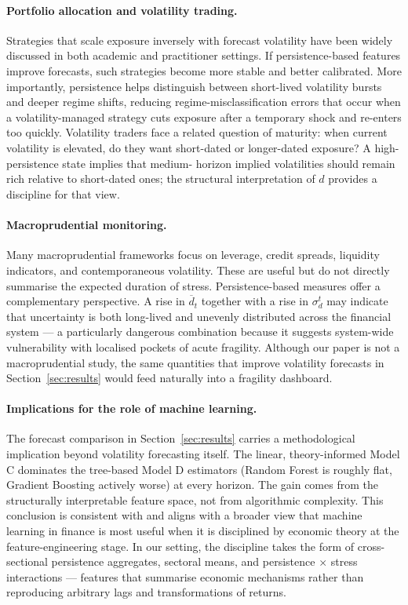 \documentclass[11pt,a4paper]{article}
\newcommand{\dhat}{\hat d}
\begin{document}
\paragraph{Portfolio allocation and volatility trading.}
Strategies that scale exposure inversely with forecast volatility have
been widely discussed in both academic and practitioner settings. If
persistence-based features improve forecasts, such strategies become
more stable and better calibrated. More importantly, persistence helps
distinguish between short-lived volatility bursts and deeper regime
shifts, reducing regime-misclassification errors that occur when a
volatility-managed strategy cuts exposure after a temporary shock and
re-enters too quickly. Volatility traders face a related question of
maturity: when current volatility is elevated, do they want short-dated
or longer-dated exposure? A high-persistence state implies that medium-
horizon implied volatilities should remain rich relative to short-dated
ones; the structural interpretation of $\dhat$ provides a discipline
for that view.

\paragraph{Macroprudential monitoring.}
Many macroprudential frameworks focus on leverage, credit spreads,
liquidity indicators, and contemporaneous volatility. These are useful
but do not directly summarise the expected duration of stress.
Persistence-based measures offer a complementary perspective. A rise in
$\overline d_t$ together with a rise in $\sigma_d^t$ may indicate that
uncertainty is both long-lived and unevenly distributed across the
financial system --- a particularly dangerous combination because it
suggests system-wide vulnerability with localised pockets of acute
fragility. Although our paper is not a macroprudential study, the same
quantities that improve volatility forecasts in
Section~\ref{sec:results} would feed naturally into a fragility
dashboard.

\paragraph{Implications for the role of machine learning.}
The forecast comparison in Section~\ref{sec:results} carries a
methodological implication beyond volatility forecasting itself. The
linear, theory-informed Model C dominates the tree-based Model D
estimators (Random Forest is roughly flat, Gradient Boosting actively
worse) at every horizon. The gain comes from the structurally
interpretable feature space, not from algorithmic complexity. This
conclusion is consistent with \citet{gu2020empirical} and aligns with a
broader view that machine learning in finance is most useful when it is
disciplined by economic theory at the feature-engineering stage. In our
setting, the discipline takes the form of cross-sectional persistence
aggregates, sectoral means, and persistence $\times$ stress
interactions --- features that summarise economic mechanisms rather
than reproducing arbitrary lags and transformations of returns.
\end{document}
